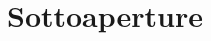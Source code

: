 \documentclass[a4paper,10pt]{article}
\renewcommand{\c}{$\clubsuit$\xspace}
\renewcommand{\d}{$\diamondsuit$\xspace}
\newcommand{\h}{$\heartsuit$\xspace}
\newcommand{\s}{$\spadesuit$\xspace}
\renewcommand{\j}{$\bigstar$\xspace}
\newcommand{\sa}{SA\xspace}
\newcommand{\m}{\mbox{\raisebox{-1.2pt}{$^\clubsuit \mkern-4.5mu$} \raisebox{1.2pt}{$\mkern-4.5mu_\diamondsuit$}}\xspace}%
\newcommand{\smallspace}{\vskip0.3cm}
\theoremstyle{definition}
\newenvironment{twocol}
{\smallspace\noindent\tabularx{\linewidth}{ l X }}%
{\endtabularx\smallspace}
\begin{document}
%
%
%
%
%
%
%
%
%
%
\section{Sottoaperture}
\end{document}
